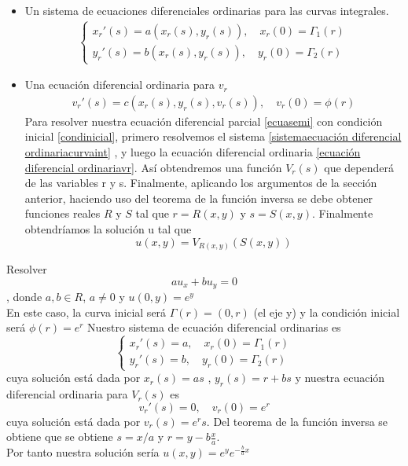 \begin{itemize}
    \item Un sistema de ecuaciones diferenciales ordinarias para las curvas integrales.
    \begin{eqnarray}
        \begin{cases}
            \label{sistemaecuación diferencial ordinariacurvaint}
             x_r'(s)=a(x_r(s),y_r(s)), \quad x_r(0)=\Gamma_1(r)\\
             y_r'(s)=b(x_r(s),y_r(s)), \quad y_r(0)=\Gamma_2(r)
        \end{cases}
    \end{eqnarray}
    \item Una ecuación diferencial ordinaria para $v_r$\label{ecuación diferencial ordinariavr}
    \begin{eqnarray}
        v_r'(s)=c(x_r(s),y_r(s),v_r(s)),\quad v_r(0)=\phi(r)
    \end{eqnarray}
    Para resolver nuestra ecuación diferencial parcial \ref{ecuasemi} con condición  inicial \ref{condinicial}, primero resolvemos el sistema \ref{sistemaecuación diferencial ordinariacurvaint} , y luego la ecuación diferencial ordinaria \ref{ecuación diferencial ordinariavr}. Así obtendremos una función $V_r(s)$ que dependerá de las variables r y s.
    Finalmente, aplicando los argumentos de la sección anterior, haciendo uso del teorema de la función inversa se debe obtener funciones reales $R$ y $S$ tal que $r=R(x,y)$ y  $s=S(x,y)$.
    Finalmente obtendríamos la solución u tal que $$u(x,y)=V_{R(x,y)}(S(x,y))$$
 \end{itemize}
\begin{Ejm}
    Resolver $$au_x+bu_y=0$$, donde $a,b\in R$, $a\not=0$ y $u(0,y)=e^y$\\
    En este caso, la curva inicial será $\Gamma(r)=(0,r)$ (el eje y) y la condición inicial será $\phi(r)=e^r$
    Nuestro sistema de ecuación diferencial ordinarias es 
    $$\begin{cases}
        x_r'(s)=a, \quad x_r(0)=\Gamma_1(r)\\
        y_r'(s)=b, \quad y_r(0)=\Gamma_2(r)
    \end{cases}$$
    cuya solución está dada por $x_r(s)=as$ , $y_r(s)=r+bs$
    y nuestra ecuación diferencial ordinaria para $V_r(s)$ es
    $$ v_r'(s)=0,\quad v_r(0)=e^r$$ cuya solución está dada por $v_r(s)=e^rs.$ Del teorema de la función inversa se obtiene que se obtiene $s=x/a$ y $r=y-b\frac{x}{a}$.\\Por tanto nuestra solución sería $u(x,y)=e^ye^{-\frac{b}{a}x}$
\end{Ejm}